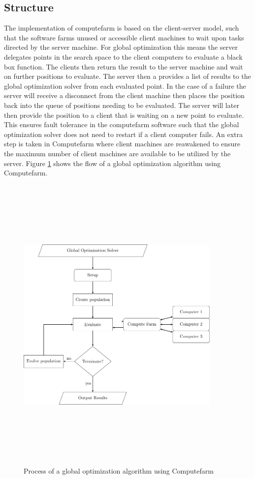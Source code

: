 \subsection{Structure}
 The implementation of computefarm is based on the client-server model, such that the software farms unused or accessible client machines to wait upon tasks directed by the server machine. For global optimization this means the server delegates points in the search space to the client computers to evaluate a black box function. The clients then return the result to the server machine and wait on further positions to evaluate. The server then a provides a list of
  results to the
  global optimization solver from each evaluated point. 
  In the case of a failure the server will receive a disconnect from the client machine then places the position back into the queue of positions needing to be evaluated. The server will later then provide the position to a client that is waiting on a new point to evaluate. This ensures fault tolerance in the computefarm software such that the global optimization solver does not need to restart if a client computer fails.  
  An extra step is taken in Computefarm where client machines are reawakened to ensure the maximum number of client machines are available to be utilized by the server. 
  Figure \ref{fig:computefarm} shows the flow of a global optimization algorithm using Computefarm. 
\clearpage
\begin{figure}[h!]
    \centering
    \includegraphics[width=10cm,height=15cm]{chapters/chapter_3_Software/flowchart.pdf}
    \caption{Process of a global optimization algorithm using Computefarm}
    \label{fig:computefarm}
\end{figure}
